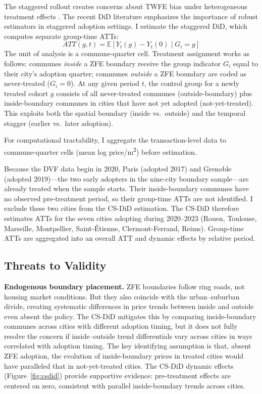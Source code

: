 \documentclass[12pt]{article}
\newcommand{\E}{\mathbb{E}}
\begin{document}
The staggered rollout creates concerns about TWFE bias under heterogeneous treatment effects \citep{goodmanbacon2021difference, dechaisemartin2020two, sun2021estimating}. The recent DiD literature \citep{roth2023whats, borusyak2024revisiting} emphasizes the importance of robust estimators in staggered adoption settings. I estimate the \citet{callaway2021difference} staggered DiD, which computes separate group-time ATTs:
\begin{equation}
ATT(g,t) = \E[Y_t(g) - Y_t(0) \mid G_i = g]
\end{equation}
The unit of analysis is a commune-quarter cell. Treatment assignment works as follows: communes \textit{inside} a ZFE boundary receive the group indicator $G_i$ equal to their city's adoption quarter; communes \textit{outside} a ZFE boundary are coded as never-treated ($G_i = 0$). At any given period $t$, the control group for a newly treated cohort $g$ consists of all never-treated communes (outside-boundary) plus inside-boundary communes in cities that have not yet adopted (not-yet-treated). This exploits both the spatial boundary (inside vs.\ outside) and the temporal stagger (earlier vs.\ later adoption).

For computational tractability, I aggregate the transaction-level data to commune-quarter cells (mean log price/m\textsuperscript{2}) before estimation.

Because the DVF data begin in 2020, Paris (adopted 2017) and Grenoble (adopted 2019)---the two early adopters in the nine-city boundary sample---are already treated when the sample starts. Their inside-boundary communes have no observed pre-treatment period, so their group-time ATTs are not identified. I exclude these two cities from the CS-DiD estimation. The CS-DiD therefore estimates ATTs for the seven cities adopting during 2020--2023 (Rouen, Toulouse, Marseille, Montpellier, Saint-\'Etienne, Clermont-Ferrand, Reims). Group-time ATTs are aggregated into an overall ATT and dynamic effects by relative period.

\subsection{Threats to Validity}

\textbf{Endogenous boundary placement.} ZFE boundaries follow ring roads, not housing market conditions. But they also coincide with the urban--suburban divide, creating systematic differences in price trends between inside and outside even absent the policy. The CS-DiD mitigates this by comparing inside-boundary communes across cities with different adoption timing, but it does not fully resolve the concern if inside--outside trend differentials vary across cities in ways correlated with adoption timing. The key identifying assumption is that, absent ZFE adoption, the evolution of inside-boundary prices in treated cities would have paralleled that in not-yet-treated cities. The CS-DiD dynamic effects (Figure~\ref{fig:csdid}) provide supportive evidence: pre-treatment effects are centered on zero, consistent with parallel inside-boundary trends across cities.
\end{document}
